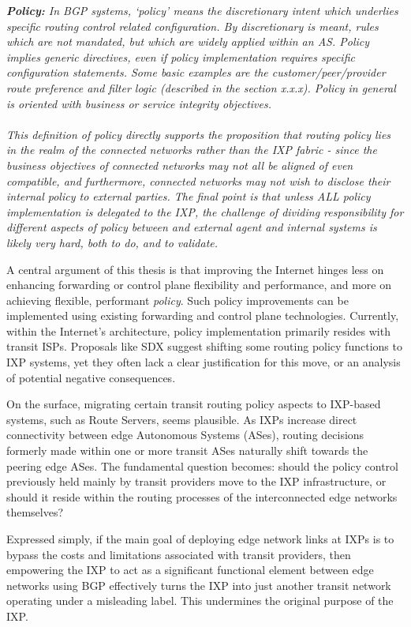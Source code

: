 \textit{ \textbf{Policy:} In BGP systems, `policy' means the discretionary intent which underlies specific routing control related configuration. By discretionary is meant, rules which are not mandated, but which are widely applied within an AS.  Policy implies generic directives, even if policy implementation requires specific configuration statements.   Some basic examples are the customer/peer/provider route preference and filter logic (described in the section x.x.x).   Policy in general is oriented with business or service integrity objectives.
\\
\\
This definition of policy directly supports the proposition that routing policy lies in the realm of the connected networks rather than the IXP fabric - since the business objectives of connected networks may not all be aligned of even compatible, and furthermore, connected networks may not wish to disclose their internal policy to external parties.  The final point is that unless ALL policy implementation is delegated to the IXP, the challenge of dividing responsibility for different aspects of policy between and external agent and internal systems is likely very hard, both to do, and to validate. }

A central argument of this thesis is that improving the Internet hinges less on enhancing forwarding or control plane flexibility and performance, and more on achieving flexible, performant \textit{policy}. Such policy improvements can be implemented using existing forwarding and control plane technologies. Currently, within the Internet's architecture, policy implementation primarily resides with transit ISPs. Proposals like SDX suggest shifting some routing policy functions to IXP systems, yet they often lack a clear justification for this move, or an analysis of potential negative consequences.

On the surface, migrating certain transit routing policy aspects to IXP-based systems, such as Route Servers, seems plausible. As IXPs increase direct connectivity between edge Autonomous Systems (ASes), routing decisions formerly made within one or more transit ASes naturally shift towards the peering edge ASes. The fundamental question becomes: should the policy control previously held mainly by transit providers move to the IXP infrastructure, or should it reside within the routing processes of the interconnected edge networks themselves?

Expressed simply, if the main goal of deploying edge network links at IXPs is to bypass the costs and limitations associated with transit providers, then empowering the IXP to act as a significant functional element between edge networks using BGP effectively turns the IXP into just another transit network operating under a misleading label. This undermines the original purpose of the IXP.

